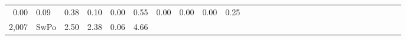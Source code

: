 \documentclass[]{article}
\begin{document}
\begin{longtable}[]{@{}rlrrrrrrrrrrrrrrrrrrrrrrrrrrr@{}}
\begin{minipage}[t]{0.02\columnwidth}
0.00\strut
\end{minipage} & \begin{minipage}[t]{0.02\columnwidth}\raggedleft\strut
0.09\strut
\end{minipage} & \begin{minipage}[t]{0.01\columnwidth}\raggedleft\strut
0.38\strut
\end{minipage} & \begin{minipage}[t]{0.01\columnwidth}\raggedleft\strut
0.10\strut
\end{minipage} & \begin{minipage}[t]{0.01\columnwidth}\raggedleft\strut
0.00\strut
\end{minipage} & \begin{minipage}[t]{0.02\columnwidth}\raggedleft\strut
0.55\strut
\end{minipage} & \begin{minipage}[t]{0.01\columnwidth}\raggedleft\strut
0.00\strut
\end{minipage} & \begin{minipage}[t]{0.01\columnwidth}\raggedleft\strut
0.00\strut
\end{minipage} & \begin{minipage}[t]{0.01\columnwidth}\raggedleft\strut
0.00\strut
\end{minipage} & \begin{minipage}[t]{0.01\columnwidth}\raggedleft\strut
0.25\strut
\end{minipage}\tabularnewline
\begin{minipage}[t]{0.01\columnwidth}\raggedleft\strut
2,007\strut
\end{minipage} & \begin{minipage}[t]{0.02\columnwidth}\raggedright\strut
SwPo\strut
\end{minipage} & \begin{minipage}[t]{0.01\columnwidth}\raggedleft\strut
2.50\strut
\end{minipage} & \begin{minipage}[t]{0.02\columnwidth}\raggedleft\strut
2.38\strut
\end{minipage} & \begin{minipage}[t]{0.02\columnwidth}\raggedleft\strut
0.06\strut
\end{minipage} & \begin{minipage}[t]{0.02\columnwidth}\raggedleft\strut
4.66\strut
\end{minipage} & \begin{minipage}[t]{0.01\columnwidth}\raggedleft\strut

\end{minipage}
\end{longtable}
\end{document}
